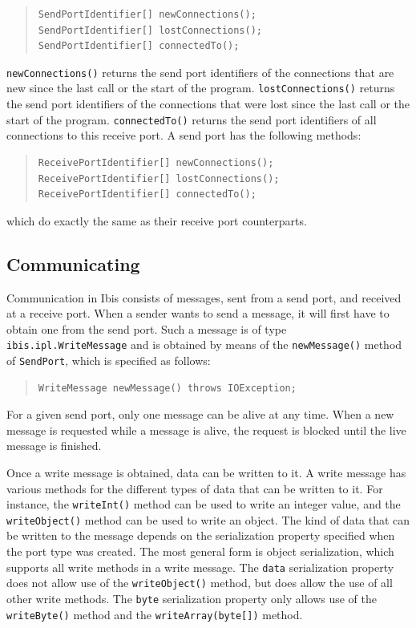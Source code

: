 \documentclass[10pt]{article}
\newcommand{\mysubsection}[1]{\subsection{#1}\label{#1}}
\begin{document}
{\small
\begin{quote}
\begin{verbatim}
SendPortIdentifier[] newConnections();
SendPortIdentifier[] lostConnections();
SendPortIdentifier[] connectedTo();
\end{verbatim}
\end{quote}
}

\texttt{newConnections()} returns the send port identifiers of the connections
that are new since the last call or the start of the program.
\texttt{lostConnections()} returns the send port identifiers of the connections
that were lost since the last call or the start of the program.
\texttt{connectedTo()} returns the send port identifiers of all connections
to this receive port.
A send port has the following methods:

{\small
\begin{quote}
\begin{verbatim}
ReceivePortIdentifier[] newConnections();
ReceivePortIdentifier[] lostConnections();
ReceivePortIdentifier[] connectedTo();
\end{verbatim}
\end{quote}
}
\noindent
which do exactly the same as their receive port counterparts.

\mysubsection{Communicating}

Communication in Ibis
consists of messages, sent from a send port, and received at a
receive port. When a sender wants to send a message, it will first
have to obtain one from the send port. Such a message is of
type \texttt{ibis.ipl.WriteMessage} and is obtained by means of
the \texttt{newMessage()} method of \texttt{SendPort}, which is specified
as follows:

{\small
\begin{quote}
\begin{verbatim}
WriteMessage newMessage() throws IOException;
\end{verbatim}
\end{quote}
}

\noindent
For a given send port, only one message can be alive at any time.
When a new message is requested while a message is alive, the request
is blocked until the live message is finished.

Once a write message is obtained, data can be written to it.
A write message has various methods for the different types of
data that can be written to it. For instance, the
\texttt{writeInt()} method can be used to write an integer value,
and the \texttt{writeObject()} method can be used to write an object.
The kind of data that can be written to the message depends on the
serialization property specified when the port type was created.
The most general form is object serialization, which supports 
all write methods in a write message.
The \texttt{data} serialization property does not allow use of the
\texttt{writeObject()} method, but does allow the use of all other write
methods. The \texttt{byte} serialization property only allows use
of the \texttt{writeByte()} method and the \texttt{writeArray(byte[])}
method.
\end{document}
